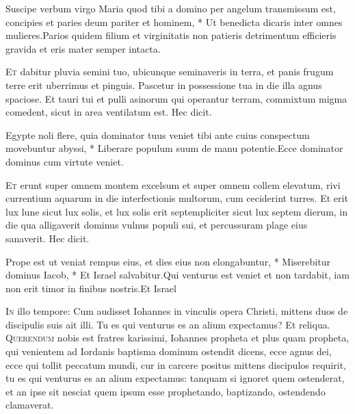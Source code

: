 \begin{multicols*}{2}
\begin{responsory}
{Suscipe verbum virgo Maria quod tibi a domino per angelum transmissum est, concipies et paries deum pariter et hominem, * Ut benedicta dicaris inter omnes mulieres.}{Parios quidem filium et virginitatis non patieris detrimentum efficieris gravida et eris mater semper intacta.}
\end{responsory}
\lettrine[lines=2]{\zallmancaps \color{Blue} E}{t} dabitur pluvia semini tuo, ubicunque seminaveris in terra, et panis frugum terre erit uberrimus et pinguis. Pascetur in possessione tua in die illa agnus spaciose. Et tauri tui et pulli asinorum qui operantur terram, commixtum migma comedent, sicut in area ventilatum est. Hec dicit.
\begin{responsory}
{Egypte noli flere, quia dominator tuus veniet tibi ante cuius conspectum movebuntur abyssi, * Liberare populum suum de manu potentie.}{Ecce dominator dominus cum virtute veniet.}
\end{responsory}
\lettrine[lines=2]{\zallmancaps \color{Red} E}{t} erunt super omnem montem excelsum et super omnem collem elevatum, rivi currentium aquarum in die interfectionis multorum, cum ceciderint turres. Et erit lux lune sicut lux solis, et lux solis erit septempliciter sicut lux septem dierum, in die qua alligaverit dominus vulnus populi sui, et percussuram plage eius sanaverit. Hec dicit.
\begin{responsory-final}
{Prope est ut veniat rempus eius, et dies eius non elongabuntur, * Miserebitur dominus Iacob, * Et Israel salvabitur.}{Qui venturus est veniet et non tardabit, iam non erit timor in finibus nostris.}{Et Israel}
\end{responsory-final}
\lettrine[lines=2]{\zallmancaps \color{Blue} I}{n} illo tempore: Cum audisset Iohannes in vinculis opera Christi, mittens duos de discipulis suis ait illi. Tu es qui venturus es an alium expectamus? Et reliqua.
 
\lettrine[lines=2]{\zallmancaps \color{Red} Q}{uerendum} nobis est fratres karissimi, Iohannes propheta et plus quam propheta, qui venientem ad Iordanis baptisma dominum ostendit dicens, ecce agnus dei, ecce qui tollit peccatum mundi, cur in carcere positus mittens discipulos requirit, tu es qui venturus es an alium expectamus: tanquam si ignoret quem ostenderat, et an ipse sit nesciat quem ipsum esse prophetando, baptizando, ostendendo clamaverat.

\end{multicols*}
